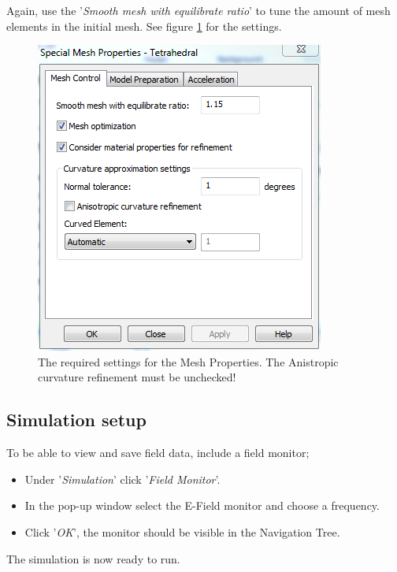 Again, use the '\textit{Smooth mesh with equilibrate ratio}' to tune the amount of mesh elements in the initial mesh.
See figure \ref{fig:MeshProperties} for the settings.
\begin{figure}[h]
	\begin{center}
		\includegraphics[scale = .6]{Figures/MeshProperties}
		\caption{The required settings for the Mesh Properties. The Anistropic curvature refinement must be unchecked!}
		\label{fig:MeshProperties}
	\end{center}
\end{figure}

\subsection{Simulation setup}
To be able to view and save field data, include a field monitor;
\begin{itemize}
	\item Under '\textit{Simulation}' click '\textit{Field Monitor}'.
	\item In the pop-up window select the E-Field monitor and choose a frequency.
	\item Click '\textit{OK}', the monitor should be visible in the Navigation Tree.
\end{itemize}
The simulation is now ready to run.

